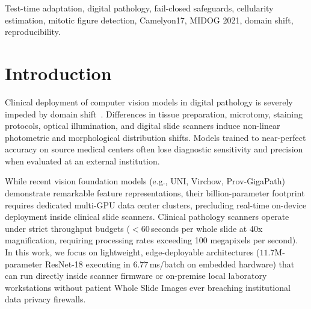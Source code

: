 \documentclass[conference]{IEEEtran}
\begin{document}
\begin{abstract}
In Track~B (Mitotic Figure Detection), existing fail-closed controllers (Original SafeAdapt) suffer from a critical biological flaw: detector silence in normal, acellular stroma triggers false collapse alarms ($2.67$ alarms/seed), forcing premature permanent fallback to frozen source ($F_1 = 0.4630 \pm 0.0020$). To resolve this, we propose \textbf{Bio-SafeAdapt}, which conditions silence monitoring on local Hematoxylin Optical Density ($H\text{-OD} \ge 0.12$) via color deconvolution, incorporates elastic source parameter anchoring ($\lambda_{\text{anchor}} = 0.01$), and executes episodic case-boundary resets. Bio-SafeAdapt completely eliminates false collapse alarms in acellular tissue ($0.0$ vs $2.67$), achieving $F_1 = 0.4732 \pm 0.0023$ ($N=3$ random seeds) on held-out Scanner~3---an authentic incremental gain of $+0.0102$\,$F_1$ over SafeAdapt (paired $t = 10.67, p = 0.0087$, Cohen's $d_z = 6.16$) and $+0.0147$\,$F_1$ over Frozen Source ($0.4585 \pm 0.0079, p < 0.0001, t = 17.15$). 10,000 paired case-clustered bootstrap resamples across 50 whole-slide images confirm positive spatial adaptation ($\Delta F_{1,\text{micro}} = +0.00755, p = 0.0187$). We establish that biological context is essential to prevent safeguard misfires, and that operational failure containment must not be confused with unverified clinical safety.
\end{abstract}

\begin{IEEEkeywords}
Test-time adaptation, digital pathology, fail-closed safeguards, cellularity estimation, mitotic figure detection, Camelyon17, MIDOG 2021, domain shift, reproducibility.
\end{IEEEkeywords}

\section{Introduction}
Clinical deployment of computer vision models in digital pathology is severely impeded by domain shift~\cite{koh2021wilds,bandi2018camelyon17,aubreville2023mitosis}. Differences in tissue preparation, microtomy, staining protocols, optical illumination, and digital slide scanners induce non-linear photometric and morphological distribution shifts. Models trained to near-perfect accuracy on source medical centers often lose diagnostic sensitivity and precision when evaluated at an external institution.

While recent vision foundation models (e.g., UNI, Virchow, Prov-GigaPath) demonstrate remarkable feature representations, their billion-parameter footprint requires dedicated multi-GPU data center clusters, precluding real-time on-device deployment inside clinical slide scanners. Clinical pathology scanners operate under strict throughput budgets ($<60$\,seconds per whole slide at 40x magnification, requiring processing rates exceeding 100 megapixels per second). In this work, we focus on lightweight, edge-deployable architectures ($11.7\text{M}$-parameter ResNet-18 executing in $6.77$\,ms/batch on embedded hardware) that can run directly inside scanner firmware or on-premise local laboratory workstations without patient Whole Slide Images ever breaching institutional data privacy firewalls.
\end{document}
